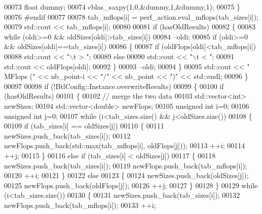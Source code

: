 \begin{DoxyCode}
00073       \textcolor{keywordtype}{float} dummy;
00074       cblas\_saxpy(1,0,&dummy,1,&dummy,1);
00075     \}
00076 \textcolor{preprocessor}{    #endif}
00077 
00078     tab\_mflops[i] = perf\_action.eval\_mflops(tab\_sizes[i]);
00079     std::cout << tab\_mflops[i];
00080     
00081     \textcolor{keywordflow}{if} (hasOldResults)
00082     \{
00083       \textcolor{keywordflow}{while} (oldi>=0 && oldSizes[oldi]>tab\_sizes[i])
00084         --oldi;
00085       \textcolor{keywordflow}{if} (oldi>=0 && oldSizes[oldi]==tab\_sizes[i])
00086       \{
00087         \textcolor{keywordflow}{if} (oldFlops[oldi]<tab\_mflops[i])
00088           std::cout << \textcolor{stringliteral}{"\(\backslash\)t > "};
00089         \textcolor{keywordflow}{else}
00090           std::cout << \textcolor{stringliteral}{"\(\backslash\)t < "};
00091         std::cout << oldFlops[oldi];
00092       \}
00093       --oldi;
00094     \}
00095     std::cout << \textcolor{stringliteral}{" MFlops    ("} << nb\_point-i << \textcolor{stringliteral}{"/"} << nb\_point << \textcolor{stringliteral}{")"} << std::endl;
00096   \}
00097 
00098   \textcolor{keywordflow}{if} (!BtlConfig::Instance.overwriteResults)
00099   \{
00100     \textcolor{keywordflow}{if} (hasOldResults)
00101     \{
00102       \textcolor{comment}{// merge the two data}
00103       std::vector<int> newSizes;
00104       std::vector<double> newFlops;
00105       \textcolor{keywordtype}{unsigned} \textcolor{keywordtype}{int} i=0;
00106       \textcolor{keywordtype}{unsigned} \textcolor{keywordtype}{int} j=0;
00107       \textcolor{keywordflow}{while} (i<tab\_sizes.size() && j<oldSizes.size())
00108       \{
00109         \textcolor{keywordflow}{if} (tab\_sizes[i] == oldSizes[j])
00110         \{
00111           newSizes.push\_back(tab\_sizes[i]);
00112           newFlops.push\_back(std::max(tab\_mflops[i], oldFlops[j]));
00113           ++i;
00114           ++j;
00115         \}
00116         \textcolor{keywordflow}{else} \textcolor{keywordflow}{if} (tab\_sizes[i] < oldSizes[j])
00117         \{
00118           newSizes.push\_back(tab\_sizes[i]);
00119           newFlops.push\_back(tab\_mflops[i]);
00120           ++i;
00121         \}
00122         \textcolor{keywordflow}{else}
00123         \{
00124           newSizes.push\_back(oldSizes[j]);
00125           newFlops.push\_back(oldFlops[j]);
00126           ++j;
00127         \}
00128       \}
00129       \textcolor{keywordflow}{while} (i<tab\_sizes.size())
00130       \{
00131         newSizes.push\_back(tab\_sizes[i]);
00132         newFlops.push\_back(tab\_mflops[i]);
00133         ++i;

\end{DoxyCode}

